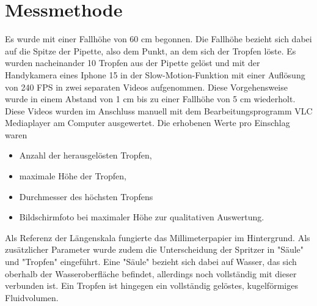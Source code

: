 \documentclass[twocolumn,10pt]{extarticle}
\begin{document}
\section{Messmethode}
Es wurde mit einer Fallhöhe von 60 cm begonnen. Die Fallhöhe bezieht sich dabei auf die Spitze der Pipette, also dem Punkt, an dem sich der Tropfen löste. Es wurden nacheinander 10 Tropfen aus der Pipette gelöst und mit der Handykamera eines Iphone 15 in der Slow-Motion-Funktion mit einer Auflösung von 240 FPS in zwei separaten Videos aufgenommen. Diese Vorgehensweise wurde in einem Abstand von 1 cm bis zu einer Fallhöhe von 5 cm wiederholt.
Diese Videos wurden im Anschluss manuell mit dem Bearbeitungsprogramm VLC Mediaplayer am Computer ausgewertet. Die erhobenen Werte pro Einschlag waren 
\begin{itemize}
    \item Anzahl der herausgelösten Tropfen,
    \item maximale Höhe der Tropfen,
    \item Durchmesser des höchsten Tropfens
    \item Bildschirmfoto bei maximaler Höhe zur qualitativen Auswertung.
\end{itemize}  
Als Referenz der Längenskala fungierte das Millimeterpapier im Hintergrund. Als zusätzlicher Parameter wurde zudem die Unterscheidung der Spritzer in "Säule" und "Tropfen" eingeführt. Eine "Säule" bezieht sich dabei auf Wasser, das sich oberhalb der Wasseroberfläche befindet, allerdings noch vollständig mit dieser verbunden ist. Ein Tropfen ist hingegen ein vollständig gelöstes, kugelförmiges Fluidvolumen. 
\end{document}
